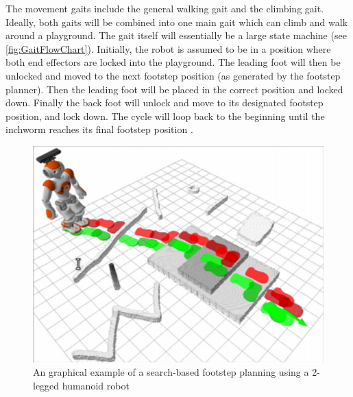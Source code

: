 The movement gaits include the general walking gait and the climbing gait. Ideally, both gaits will be combined into one main gait which can climb and walk around a playground. The gait itself will essentially be a large state machine (see \autoref{fig:GaitFlowChart}). Initially, the robot is assumed to be in a position where both end effectors are locked into the playground. The leading foot will then be unlocked and moved to the next footstep position (as generated by the footstep planner). Then the leading foot will be placed in the correct position and locked down. Finally the back foot will unlock and move to its designated footstep position, and lock down. The cycle will loop back to the beginning until the inchworm reaches its final footstep position \cite{InchwormLocomotion} \cite{GaitGeneration} \cite{LeggedRobotsNavPlanning}.

\begin{figure}[ht]
    \includegraphics[width=\linewidth]{figures/FootStepPlanner.png}
    \caption{An graphical example of a search-based footstep planning using a 2-legged humanoid robot \cite{SearchFootstepPlanner}}
    \label{fig:FootstepPlannerExample}
\end{figure} 

